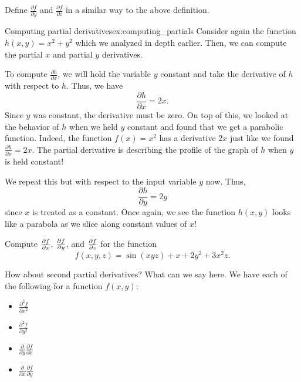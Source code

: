                         \begin{exercise}
                        Define $\frac{\partial f}{\partial y}$ and $\frac{\partial f}{\partial z}$ in a similar way to the above definition.
                        \end{exercise}

                        \begin{ex}{Computing partial derivatives}{ex:computing_partials}
                            Consider again the function $h(x,y)=x^2+y^2$ which we analyzed in depth earlier. Then, we can compute the partial $x$ and partial $y$ derivatives. 

                            To compute $\frac{\partial h}{\partial x}$, we will hold the variable $y$ constant and take the derivative of $h$ with respect to $h$. Thus, we have
                            \[
                                \frac{\partial h}{\partial x} = 2x.
                            \]
                            Since $y$ was constant, the derivative must be zero. On top of this, we looked at the behavior of $h$ when we held $y$ constant and found that we get a parabolic function. Indeed, the function $f(x)=x^2$ has a derivative $2x$ just like we found $\frac{\partial h}{\partial x}=2x$. The partial derivative is describing the profile of the graph of $h$ when $y$ is held constant!

                            We repeat this but with respect to the input variable $y$ now. Thus,
                            \[
                            \frac{\partial h}{\partial y} = 2y
                            \]
                            since $x$ is treated as a constant. Once again, we see the function $h(x,y)$ looks like a parabola as we slice along constant values of $x$!
                        \end{ex}
                            
                        
                        \begin{exercise}
                        Compute $\frac{\partial f}{\partial x}$, $\frac{\partial f}{\partial y}$, and $\frac{\partial f}{\partial z}$ for the function 
                        \[
                        f(x,y,z)=\sin(xyz)+x+2y^2+3x^2z.
                        \]
                        \end{exercise}
                        
                        How about second partial derivatives? What can we say here. We have each of the following for a function $f(x,y)$:
                        \begin{itemize}
                            \item $\frac{\partial^2 f}{\partial x^2}$
                            \item $\frac{\partial^2 f}{\partial y^2}$
                            \item $\frac{\partial}{\partial y}\frac{\partial f}{\partial x}$
                            \item $\frac{\partial}{\partial x}\frac{\partial f}{\partial y}$
                        \end{itemize}
                        
